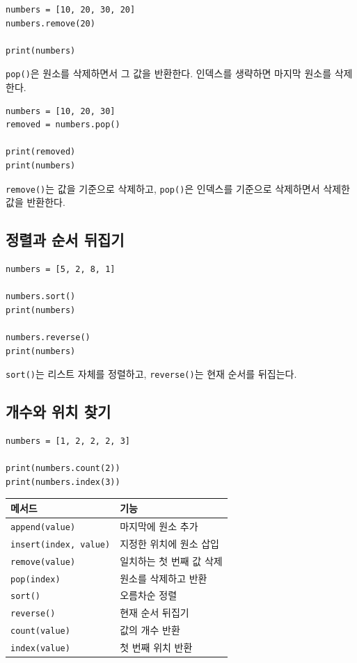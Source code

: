 \documentclass[11pt,a4paper]{article}
\begin{document}
\begin{lstlisting}
numbers = [10, 20, 30, 20]
numbers.remove(20)

print(numbers)
\end{lstlisting}

\texttt{pop()}은 원소를 삭제하면서 그 값을 반환한다. 인덱스를 생략하면 마지막 원소를 삭제한다.

\begin{lstlisting}
numbers = [10, 20, 30]
removed = numbers.pop()

print(removed)
print(numbers)
\end{lstlisting}

\begin{importantbox}
\texttt{remove()}는 값을 기준으로 삭제하고, \texttt{pop()}은 인덱스를 기준으로 삭제하면서 삭제한 값을 반환한다.
\end{importantbox}

\subsection{정렬과 순서 뒤집기}

\begin{lstlisting}
numbers = [5, 2, 8, 1]

numbers.sort()
print(numbers)

numbers.reverse()
print(numbers)
\end{lstlisting}

\texttt{sort()}는 리스트 자체를 정렬하고, \texttt{reverse()}는 현재 순서를 뒤집는다.

\subsection{개수와 위치 찾기}

\begin{lstlisting}
numbers = [1, 2, 2, 2, 3]

print(numbers.count(2))
print(numbers.index(3))
\end{lstlisting}

\begin{center}
\begin{tabular}{ll}
\toprule
메서드 & 기능 \\
\midrule
\texttt{append(value)} & 마지막에 원소 추가 \\
\texttt{insert(index, value)} & 지정한 위치에 원소 삽입 \\
\texttt{remove(value)} & 일치하는 첫 번째 값 삭제 \\
\texttt{pop(index)} & 원소를 삭제하고 반환 \\
\texttt{sort()} & 오름차순 정렬 \\
\texttt{reverse()} & 현재 순서 뒤집기 \\
\texttt{count(value)} & 값의 개수 반환 \\
\texttt{index(value)} & 첫 번째 위치 반환 \\
\bottomrule
\end{tabular}
\end{center}
\end{document}

